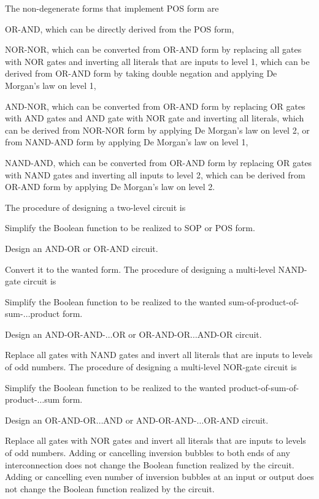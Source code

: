 \documentclass[a4paper,12pt]{report}
\begin{document}
The non-degenerate forms that implement POS form are
\bit
\item OR-AND, which can be directly derived from the POS form,
\item NOR-NOR, which can be converted from OR-AND form by replacing all gates with NOR gates and inverting all literals that are inputs to level 1, which can be derived from OR-AND form by taking double negation and applying De Morgan's law on level 1,
\item AND-NOR, which can be converted from OR-AND form by replacing OR gates with AND gates and AND gate with NOR gate and inverting all literals, which can be derived from NOR-NOR form by applying De Morgan's law on level 2, or from NAND-AND form by applying De Morgan's law on level 1,
\item NAND-AND, which can be converted from OR-AND form by replacing OR gates with NAND gates and inverting all inputs to level 2, which can be derived from OR-AND form by applying De Morgan's law on level 2.
\eit

The procedure of designing a two-level circuit is
\ben
\item Simplify the Boolean function to be realized to SOP or POS form.
\item Design an AND-OR or OR-AND circuit.
\item Convert it to the wanted form.
\een
{}
The procedure of designing a multi-level NAND-gate circuit is
\ben
\item Simplify the Boolean function to be realized to the wanted sum-of-product-of-sum-$\ldots$product form.
\item Design an AND-OR-AND-$\ldots$OR or OR-AND-OR$\ldots$AND-OR circuit.
\item Replace all gates with NAND gates and invert all literals that are inputs to levels of odd numbers.
\een
The procedure of designing a multi-level NOR-gate circuit is
\ben
\item Simplify the Boolean function to be realized to the wanted product-of-sum-of-product-$\ldots$sum form.
\item Design an OR-AND-OR$\ldots$AND or AND-OR-AND-$\ldots$OR-AND circuit.
\item Replace all gates with NOR gates and invert all literals that are inputs to levels of odd numbers.
\een
{}
Adding or cancelling inversion bubbles to both ends of any interconnection does not change the Boolean function realized by the circuit. Adding or cancelling even number of inversion bubbles at an input or output does not change the Boolean function realized by the circuit.
\end{document}
